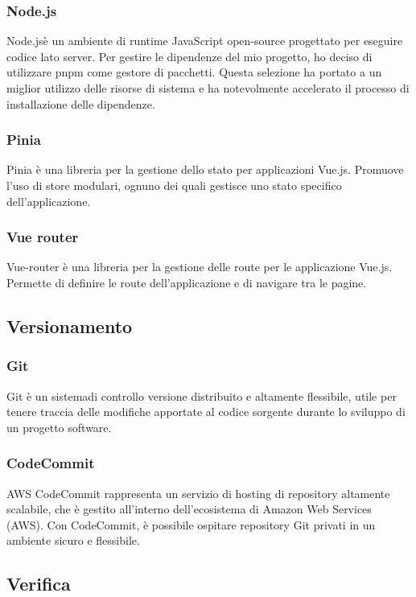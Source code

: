 \subsubsection{Node.js}\label{subsubsec:node.js}
Node.jsè un ambiente di runtime JavaScript open-source progettato per eseguire codice lato server. Per gestire le dipendenze del mio progetto,
ho deciso di utilizzare pnpm come gestore di pacchetti. Questa selezione ha portato a un miglior utilizzo delle risorse di sistema e ha notevolmente accelerato il processo di 
installazione delle dipendenze.
 \subsubsection{Pinia}\label{subsubsec:pinia}
Pinia è una libreria per la gestione dello stato per applicazioni Vue.js. Promuove l'uso di store modulari, ognuno dei quali gestisce uno stato specifico dell'applicazione.
\subsubsection{Vue router}\label{subsubsec:vue-router}
Vue-router è una libreria per la gestione delle route per le applicazione Vue.js. Permette di definire le route dell'applicazione e di navigare tra le pagine.

\subsection{Versionamento}\label{subsec:versionamento}
\subsubsection{Git}\label{subsubsec:git}
Git è un sistemadi controllo versione distribuito e altamente flessibile, utile per tenere traccia delle modifiche apportate al codice sorgente durante lo sviluppo di un progetto software.
\subsubsection{CodeCommit}\label{subsubsec:CodeCommit}
AWS CodeCommit rappresenta un servizio di hosting di repository altamente scalabile, che è gestito all'interno dell'ecosistema di Amazon Web Services (AWS). 
Con CodeCommit, è possibile ospitare repository Git privati in un ambiente sicuro e flessibile.

\subsection{Verifica}\label{subsec:verifica}
